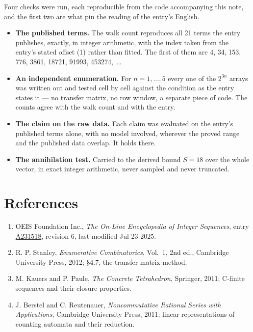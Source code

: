 \documentclass[11pt]{article}
\theoremstyle{definition}
\begin{document}
Four checks were run, each reproducible from the code accompanying this note, and the first two are what pin the reading of the entry's English.

\begin{itemize}

\item {\bfseries The published terms.} The walk count reproduces all 21 terms the entry publishes, exactly, in integer arithmetic, with the index taken from the entry's stated offset (1) rather than fitted. The first of them are 4, 34, 153, 776, 3861, 18721, 91993, 453274,~\dots

\item {\bfseries An independent enumeration.} For $n = 1,\dots,5$ every one of the $2^{3n}$ arrays was written out and tested cell by cell against the condition as the entry states it --- no transfer matrix, no row window, a separate piece of code. The counts agree with the walk count and with the entry.

\item {\bfseries The claim on the raw data.} Each claim was evaluated on the entry's published terms alone, with no model involved, wherever the proved range and the published data overlap. It holds there.

\item {\bfseries The annihilation test.} Carried to the derived bound $S = 18$ over the whole vector, in exact integer arithmetic, never sampled and never truncated.

\end{itemize}

\section{References}

\begin{enumerate}

\item OEIS Foundation Inc., \emph{The On-Line Encyclopedia of Integer Sequences}, entry \href{https://oeis.org/A231518}{A231518}, revision 6, last modified Jul 23 2025.

\item R. P. Stanley, \emph{Enumerative Combinatorics}, Vol.~1, 2nd ed., Cambridge University Press, 2012; \S4.7, the transfer-matrix method.

\item M. Kauers and P. Paule, \emph{The Concrete Tetrahedron}, Springer, 2011; C-finite sequences and their closure properties.

\item J. Berstel and C. Reutenauer, \emph{Noncommutative Rational Series with Applications}, Cambridge University Press, 2011; linear representations of counting automata and their reduction.

\end{enumerate}
\end{document}
